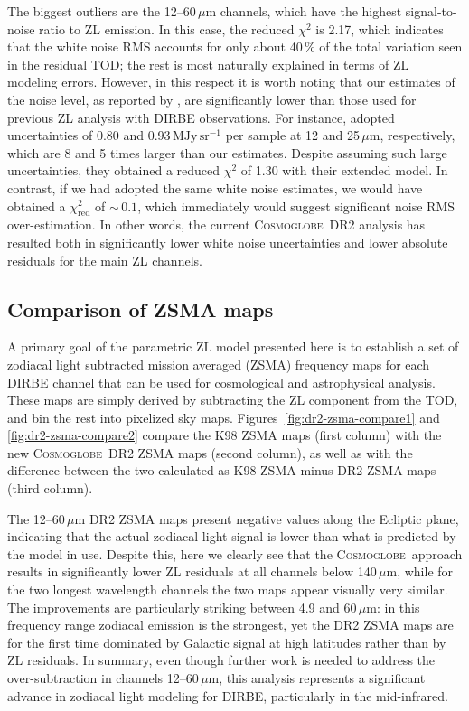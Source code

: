\documentclass[twocolumn]{aa}
\newcommand{\cosmoglobe}{\textsc{Cosmoglobe}}
\begin{document}
The biggest outliers are  the 12--60$\,\mu$m channels, which
have the highest signal-to-noise ratio to ZL emission. In this case,
the reduced $\chi^2$ is 2.17, which indicates that the white noise RMS
accounts for only about 40\,\% of the total variation seen in the residual
TOD; the rest is most naturally explained in terms of ZL modeling
errors. However, in this respect it is worth noting that our estimates
of the noise level, as reported by \citet{CG02_01}, are
significantly lower than those used for previous ZL analysis with
DIRBE observations. For instance, \citet{Robinson2013} adopted
uncertainties of 0.80 and $0.93\,\mathrm{MJy\,sr^{-1}}$ per sample at 12 and
25$\,\mu$m, respectively, which are 8 and 5 times larger than our
estimates. Despite assuming such large uncertainties, they obtained a
reduced $\chi^2$ of 1.30 with their extended model. In contrast, if we
had adopted the same white noise estimates, we would have obtained a
$\chi_\mathrm{red}^2$ of $\sim$\,$0.1$, which immediately would suggest
significant noise RMS over-estimation. In other words, the current
\cosmoglobe\ DR2 analysis has resulted both in significantly lower
white noise uncertainties and lower absolute residuals for the main ZL
channels.


\subsection{Comparison of ZSMA maps}

A primary goal of the parametric ZL model presented here is to
establish a set of zodiacal light subtracted mission averaged (ZSMA)
frequency maps for each DIRBE channel that can be used for
cosmological and astrophysical analysis. These maps are simply derived
by subtracting the ZL component from the TOD, and bin the rest
into pixelized sky maps. Figures~\ref{fig:dr2-zsma-compare1} and \ref{fig:dr2-zsma-compare2}
compare the K98 ZSMA maps (first column) with the new
\cosmoglobe\ DR2 ZSMA maps (second column), as well as with the
difference between the two calculated as K98 ZSMA minus DR2 ZSMA maps (third column).

The 12--60\,$\mu$m DR2 ZSMA maps present negative 
values along the Ecliptic plane, indicating that the actual zodiacal light signal is lower than 
what is predicted by the model in use. Despite this, here we clearly
see that the \cosmoglobe\ approach results in significantly lower ZL residuals at
all channels below 140\,$\mu$m, while for the two longest wavelength
channels the two maps appear visually very similar. The improvements
are particularly striking between 4.9 and 60$\,\mu$m: in this frequency range zodiacal
emission is the strongest, yet the DR2 ZSMA maps are for the first time dominated by Galactic
signal at high latitudes rather than by ZL residuals. In summary, even though further work is needed 
to address the over-subtraction in channels 12--60\,$\mu$m, this analysis represents a 
significant advance in zodiacal light modeling for DIRBE, particularly in the mid-infrared.
\end{document}
